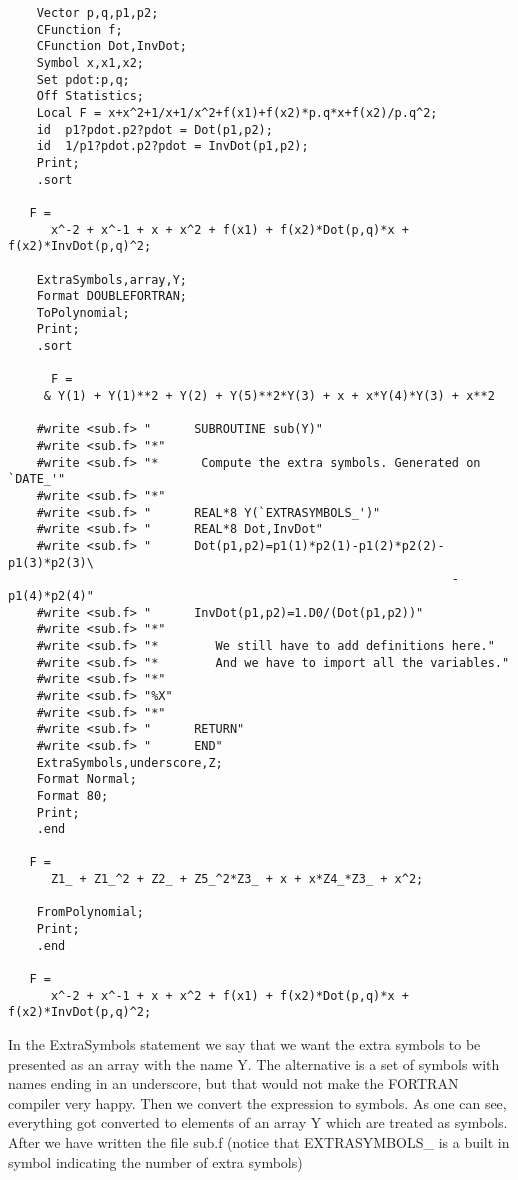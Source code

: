 \begin{verbatim}
    Vector p,q,p1,p2;
    CFunction f;
    CFunction Dot,InvDot;
    Symbol x,x1,x2;
    Set pdot:p,q;
    Off Statistics;
    Local F = x+x^2+1/x+1/x^2+f(x1)+f(x2)*p.q*x+f(x2)/p.q^2;
    id  p1?pdot.p2?pdot = Dot(p1,p2);
    id  1/p1?pdot.p2?pdot = InvDot(p1,p2);
    Print;
    .sort

   F =
      x^-2 + x^-1 + x + x^2 + f(x1) + f(x2)*Dot(p,q)*x + f(x2)*InvDot(p,q)^2;

    ExtraSymbols,array,Y;
    Format DOUBLEFORTRAN;
    ToPolynomial;
    Print;
    .sort

      F =
     & Y(1) + Y(1)**2 + Y(2) + Y(5)**2*Y(3) + x + x*Y(4)*Y(3) + x**2

    #write <sub.f> "      SUBROUTINE sub(Y)"
    #write <sub.f> "*"
    #write <sub.f> "*      Compute the extra symbols. Generated on `DATE_'"
    #write <sub.f> "*"
    #write <sub.f> "      REAL*8 Y(`EXTRASYMBOLS_')"
    #write <sub.f> "      REAL*8 Dot,InvDot"
    #write <sub.f> "      Dot(p1,p2)=p1(1)*p2(1)-p1(2)*p2(2)-p1(3)*p2(3)\
                                                              -p1(4)*p2(4)"
    #write <sub.f> "      InvDot(p1,p2)=1.D0/(Dot(p1,p2))"
    #write <sub.f> "*"
    #write <sub.f> "*        We still have to add definitions here."
    #write <sub.f> "*        And we have to import all the variables."
    #write <sub.f> "*"
    #write <sub.f> "%X"
    #write <sub.f> "*"
    #write <sub.f> "      RETURN"
    #write <sub.f> "      END"
    ExtraSymbols,underscore,Z;
    Format Normal;
    Format 80;
    Print;
    .end

   F =
      Z1_ + Z1_^2 + Z2_ + Z5_^2*Z3_ + x + x*Z4_*Z3_ + x^2;

    FromPolynomial;
    Print;
    .end

   F =
      x^-2 + x^-1 + x + x^2 + f(x1) + f(x2)*Dot(p,q)*x + f(x2)*InvDot(p,q)^2;

\end{verbatim}
In the ExtraSymbols statement we say that we want the extra symbols to be 
presented as an array with the name Y. The alternative is a set of symbols 
with names ending in an underscore, but that would not make the FORTRAN 
compiler very happy. Then we convert the expression to symbols. As one can 
see, everything got converted to elements of an array Y which are treated 
as symbols. After we have written the file sub.f (notice that 
EXTRASYMBOLS\_ is a built in symbol indicating the number of extra symbols) 
